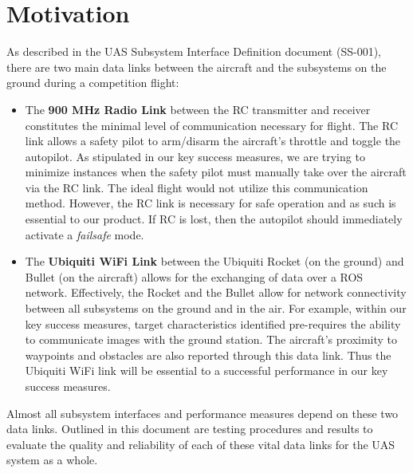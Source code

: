 \documentclass[]{auvsi_doc}
\begin{document}
\begin{AUVSITitlePage}
\begin{artifacttable}
\end{artifacttable}
\end{AUVSITitlePage}

\section{Motivation}

As described in the UAS Subsystem Interface Definition document (SS-001), there are two main data links between the aircraft and the subsystems on the ground during a competition flight:

\begin{itemize}
	\item The \textbf{900 MHz Radio Link} between the RC transmitter and receiver constitutes the minimal level of communication necessary for flight. The RC link allows a safety pilot to arm/disarm the aircraft's throttle and toggle the autopilot. As stipulated in our key success measures, we are trying to minimize instances when the safety pilot must manually take over the aircraft via the RC link. The ideal flight would not utilize this communication method. However, the RC link is necessary for safe operation and as such is essential to our product. If RC is lost, then the autopilot should immediately activate a \textit{failsafe} mode.
	\item The \textbf{Ubiquiti WiFi Link} between the Ubiquiti Rocket (on the ground) and Bullet (on the aircraft) allows for the exchanging of data over a ROS network. Effectively, the Rocket and the Bullet allow for network connectivity between all subsystems on the ground and in the air. For example, within our key success measures, target characteristics identified pre-requires the ability to communicate images with the ground station. The aircraft's proximity to waypoints and obstacles are also reported through this data link. Thus the Ubiquiti WiFi link will be essential to a successful performance in our key success measures.
\end{itemize}

Almost all subsystem interfaces and performance measures depend on these two data links. Outlined in this document are testing procedures and results to evaluate the quality and reliability of each of these vital data links for the UAS system as a whole.
\end{document}
